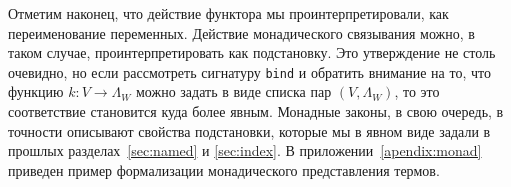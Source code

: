 Отметим наконец, что действие функтора мы проинтерпретировали, как переименование переменных. Действие монадического связывания можно, в таком случае, проинтерпретировать как подстановку. Это утверждение не столь очевидно, но если рассмотреть сигнатуру \texttt{bind} и обратить внимание на то, что функцию $k : V \to \Lambda_{W}$ можно задать в виде списка пар $(V, \Lambda_{W})$, то это соответствие становится куда более явным. Монадные законы, в свою очередь, в точности описывают свойства подстановки, которые мы в явном виде задали в прошлых разделах~\ref{sec:named} и \ref{sec:index}. В приложении~\ref{apendix:monad} приведен пример формализации монадического представления термов.
